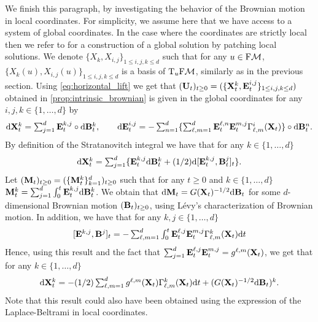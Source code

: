 We finish this paragraph, by investigating the behavior of the Brownian motion
in local coordinates. For simplicity, we assume here that we have access to a
system of global coordinates. In the case where the coordinates are strictly
local then we refer to \citet[Chapter 5, Theorem 1]{ikeda1989sto} for a
construction of a global solution by patching local solutions. We denote
$\{X_k, X_{i,j}\}_{1 \leq i,j,k \leq d}$ such that for any $u \in \mathrm{F}\mathcal{M}$,
$\{X_k(u), X_{i,j}(u)\}_{1 \leq i,j,k \leq d}$ is a basis of $\mathrm{T}_u \mathrm{F}\mathcal{M}$,
similarly as in the previous section. Using \cref{eq:horizontal_lift} we get
that $(\mathbf{U}_t)_{t \geq 0} = (\{\mathbf{X}^k_t, \mathbf{E}_t^{i,j}\}_{1 \leq i,j,k \leq d})$
obtained in \cref{prop:intrinsic_brownian} is given in the global coordinates for
any $i,j,k \in \{1, \dots, d\}$ by
\begin{equation}
  \textstyle{
    \mathrm{d}\mathbf{X}_t^k = \sum_{j=1}^d \mathbf{E}_t^{k,j} \circ \mathrm{d}\mathbf{B}_t^k  , \qquad \mathrm{d}\mathbf{E}_t^{i,j} = - \sum_{n=1}^d \{\sum_{\ell, m=1}^d \mathbf{E}_t^{\ell,n}\mathbf{E}_t^{m,j} \Gamma_{\ell,m}^{i}(\mathbf{X}_t)\} \circ \mathrm{d}\mathbf{B}_t^n  . 
    }
  \end{equation}
  By definition of the Stratanovitch integral we have that for any $k \in \{1, \dots, d\}$
  \begin{equation}
    \textstyle{
      \mathrm{d}\mathbf{X}_t^k = \sum_{j=1}^d \{ \mathbf{E}_t^{k,j} \mathrm{d}\mathbf{B}_t^k +(1/2) \mathrm{d}[\mathbf{E}_t^{k,j}, \mathbf{B}_t^j]_t \}  .
      }
    \end{equation}
    Let $(\mathbf{M}_t)_{t \geq 0} = (\{\mathbf{M}_t^k\}_{k=1}^d)_{t \geq 0}$ such that for
    any $t \geq 0$ and $k \in \{1, \dots, d\}$
    $\mathbf{M}_t^k = \sum_{j=1}^d \int_0^t \mathbf{E}_t^{k,j} \mathrm{d} \mathbf{B}_t^k$. We obtain
    that $\mathrm{d} \mathbf{M}_t = G(\mathbf{X}_t)^{-1/2} \mathrm{d} \mathbf{B}_t$ for some $d$-dimensional
    Brownian motion $(\mathbf{B}_t)_{t \geq 0}$, using L\'evy's characterization of
    Brownian motion. In addition, we have that for any
    $k, j \in \{1, \dots, d\}$
    \begin{equation}
      \textstyle{[\mathbf{E}^{k,j}, \mathbf{B}^j]_t = -\sum_{\ell, m=1}^d \int_0^t \mathbf{E}_t^{\ell, j} \mathbf{E}_t^{m,j} \Gamma_{\ell, m}^k(\mathbf{X}_t) \mathrm{d}t }
    \end{equation}
    Hence, using this result and the fact that
    $\sum_{j=1}^d \mathbf{E}_t^{\ell, j} \mathbf{E}_t^{m,j} = g^{\ell,m}(\mathbf{X}_t)$, we get
    that for any $k \in \{1, \dots, d\}$
    \begin{equation}
      \textstyle{\mathrm{d}\mathbf{X}_t^k =-  (1/2) \sum_{\ell, m=1}^d g^{\ell,m}(\mathbf{X}_t) \Gamma_{\ell, m}^k(\mathbf{X}_t) \mathrm{d}t + (G(\mathbf{X}_t)^{-1/2} \mathrm{d}\mathbf{B}_t)^k  . }
    \end{equation}
    Note that this result could also have been obtained using the expression of
    the Laplace-Beltrami in local coordinates.


